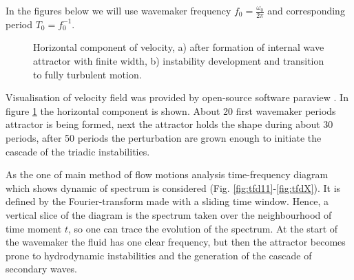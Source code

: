 \documentclass[a4wide,fontsize=12pt]{article}
\begin{document}
In the figures below we will use wavemaker frequency $\displaystyle f_0=\frac{\omega_0}{2\pi}$ and corresponding period $T_0=f_0^{-1}$. 




\begin{figure}[h!]
\centering
    \begin{minipage}[t]{0.45\textwidth}
        \centering
        \label{fig:LamAttr}
    \end{minipage}
    \begin{minipage}[t]{0.45\textwidth}
        \centering
        \label{fig:turbAttr}
    \end{minipage}
    \caption{Horizontal component of velocity, a) after formation of internal wave attractor with finite width, b) instability development and transition to fully turbulent motion.}
    \label{fig:2dAttr}
\end{figure}

Visualisation of velocity field was provided by open-source software paraview  \cite{paraview}. In figure \ref{fig:2dAttr} the horizontal component is shown. 
About 20 first wavemaker periods attractor is being formed, next the attractor holds the shape during about 30 periods, after 50 periods the perturbation are grown enough to initiate the cascade of the triadic instabilities. 
 
As the one of main method of flow motions analysis time-frequency diagram which shows dynamic of spectrum is considered (Fig. \ref{fig:tfd11}-\ref{fig:tfdX}). It is defined by the Fourier-transform made with a sliding time window. Hence, a vertical slice of the diagram is the spectrum taken over the neighbourhood of time moment $t$, so one can trace the evolution of the spectrum. At the start of the wavemaker the fluid has one clear frequency, but then the attractor becomes prone to hydrodynamic instabilities and the generation of the cascade of  secondary waves.
\end{document}
